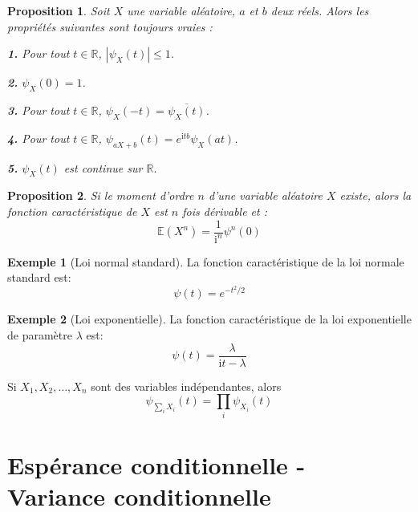 \documentclass[
]{book}
\newtheorem{proposition}{Proposition}[chapter]
\theoremstyle{definition}
\theoremstyle{definition}
\newtheorem{example}{Exemple}[chapter]
\theoremstyle{definition}
\theoremstyle{remark}
\begin{document}
\begin{proposition}
\protect\hypertarget{prp:unnamed-chunk-17}{}{\label{prp:unnamed-chunk-17} }Soit \(X\) une variable aléatoire, \(a\) et \(b\) deux réels.
Alors les propriétés suivantes sont toujours vraies :

\textbf{1.} Pour tout \(t \in \mathbb{R}\), \(\left|\psi_X(t)\right| \leq 1\).

\textbf{2.} \(\psi_X(0)=1\).

\textbf{3.} Pour tout \(t \in \mathbb{R}\), \(\psi_X(−t) = \overline{\psi_X(t)}\).

\textbf{4.} Pour tout \(t \in \mathbb{R}\), \(\psi_{aX+b}(t) = e^{\mathrm{i}tb} \psi_X(at)\).

\textbf{5.} \(\psi_X(t)\) est continue sur \(\mathbb{R}\).
\end{proposition}

\begin{proposition}
\protect\hypertarget{prp:unnamed-chunk-18}{}{\label{prp:unnamed-chunk-18} }Si le moment d'ordre \(n\) d'une variable aléatoire \(X\) existe, alors la fonction caractéristique de
\(X\) est \(n\) fois dérivable et :
\[
  \mathbb{E}\left({X}^n \right)=\dfrac{1}{{\mathrm{i}}^n}{\psi}^n(0)
  \]
\end{proposition}

\begin{example}[Loi normal standard]
\protect\hypertarget{exm:unnamed-chunk-19}{}{\label{exm:unnamed-chunk-19} {} }La fonction caractéristique de la loi normale standard est: \[\psi(t)={e}^{-t^2/2}\]
\end{example}

\begin{example}[Loi exponentielle]
\protect\hypertarget{exm:unnamed-chunk-20}{}{\label{exm:unnamed-chunk-20} {} }La fonction caractéristique de la loi exponentielle de paramètre \(\lambda\) est:
\[
  \psi(t)=\dfrac{\lambda}{\mathrm{i}t-\lambda}
  \]
\end{example}

Si \(X_1,X_2,\ldots , X_n\) sont des variables indépendantes, alors
\[
\psi_{\sum_iX_i}(t)=\prod_i\psi_{X_i}(t)
\]

\hypertarget{espuxe9rance-conditionnelle---variance-conditionnelle}{%
\section{Espérance conditionnelle - Variance conditionnelle}\label{espuxe9rance-conditionnelle---variance-conditionnelle}}
\end{document}
